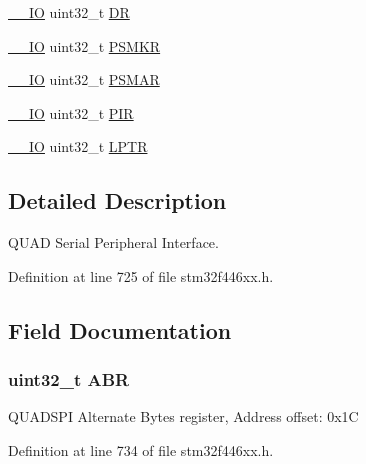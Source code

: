 \begin{DoxyCompactItemize}
\item 
\hyperlink{core__sc300_8h_aec43007d9998a0a0e01faede4133d6be}{\+\_\+\+\_\+\+IO} uint32\+\_\+t \hyperlink{struct_q_u_a_d_s_p_i___type_def_a3df0d8dfcd1ec958659ffe21eb64fa94}{DR}
\item 
\hyperlink{core__sc300_8h_aec43007d9998a0a0e01faede4133d6be}{\+\_\+\+\_\+\+IO} uint32\+\_\+t \hyperlink{struct_q_u_a_d_s_p_i___type_def_a7327d5955c8e4e3eb689a7ad2a1fa219}{P\+S\+M\+KR}
\item 
\hyperlink{core__sc300_8h_aec43007d9998a0a0e01faede4133d6be}{\+\_\+\+\_\+\+IO} uint32\+\_\+t \hyperlink{struct_q_u_a_d_s_p_i___type_def_a986e18db58469e5dd0e756b2b405b805}{P\+S\+M\+AR}
\item 
\hyperlink{core__sc300_8h_aec43007d9998a0a0e01faede4133d6be}{\+\_\+\+\_\+\+IO} uint32\+\_\+t \hyperlink{struct_q_u_a_d_s_p_i___type_def_aa9e54bfb9deb2d92de2c3f62d33793da}{P\+IR}
\item 
\hyperlink{core__sc300_8h_aec43007d9998a0a0e01faede4133d6be}{\+\_\+\+\_\+\+IO} uint32\+\_\+t \hyperlink{struct_q_u_a_d_s_p_i___type_def_ae060e16fd0b193203ddead99622260c1}{L\+P\+TR}
\end{DoxyCompactItemize}


\subsection{Detailed Description}
Q\+U\+AD Serial Peripheral Interface. 

Definition at line 725 of file stm32f446xx.\+h.



\subsection{Field Documentation}
\subsubsection[{\texorpdfstring{A\+BR}{ABR}}]{ uint32\+\_\+t A\+BR}\hypertarget{struct_q_u_a_d_s_p_i___type_def_a53d4126533b52183ef8105af2e526bd0}{}\label{struct_q_u_a_d_s_p_i___type_def_a53d4126533b52183ef8105af2e526bd0}
Q\+U\+A\+D\+S\+PI Alternate Bytes register, Address offset\+: 0x1C 

Definition at line 734 of file stm32f446xx.\+h.

